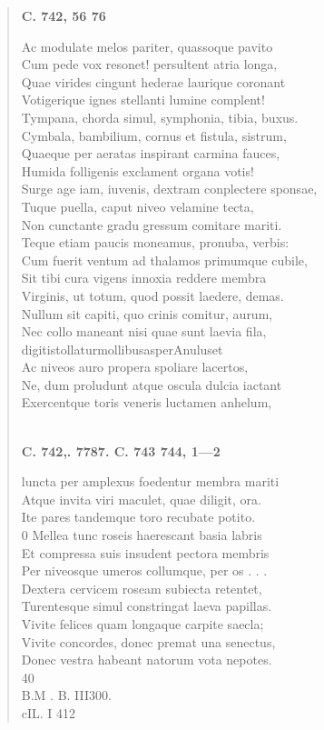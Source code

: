 \documentclass[11pt, a4paper]{report}
\begin{document}
\begin{verse}
     \marginpar{[228]} \begin{center} \textbf{C. 742, 56 76} \end{center}Ac modulate melos pariter, quassoque pavito \\ Cum pede vox resonet! persultent atria longa, \\ Quae virides cingunt hederae laurique coronant \\ Votigerique ignes stellanti lumine complent! \\ Tympana, chorda simul, symphonia, tibia, buxus. \\ Cymbala, bambilium, cornus et fistula, sistrum, \\ Quaeque per aeratas inspirant carmina fauces, \\ Humida folligenis exclament organa votis! \\ Surge age iam, iuvenis, dextram conplectere sponsae, \\ Tuque puella, caput niveo velamine tecta, \\ Non cunctante gradu gressum comitare mariti. \\ Teque etiam paucis moneamus, pronuba, verbis: \\ Cum fuerit ventum ad thalamos primumque cubile, \\ Sit tibi cura vigens innoxia reddere membra \\ Virginis, ut totum, quod possit laedere, demas. \\ Nullum sit capiti, quo crinis comitur, aurum, \\ Nec collo maneant nisi quae sunt laevia fila, \\ digitistollaturmollibusasperAnuluset \\ Ac niveos auro propera spoliare lacertos, \\ Ne, dum proludunt atque oscula dulcia iactant \\ Exercentque toris veneris luctamen anhelum, \\ 
        ﻿\pagebreak 
    \begin{center} \textbf{C. 742,. 7787. C. 743 744, 1—2} \end{center} \marginpar{[229]} luncta per amplexus foedentur membra mariti \\ Atque invita viri maculet, quae diligit, ora. \\ Ite pares tandemque toro recubate potito. \\ 0 Mellea tunc roseis haerescant basia labris \\ Et compressa suis insudent pectora membris \\ Per \rbrack  niveosque umeros collumque, per os . . . \\ Dextera cervicem roseam subiecta retentet, \\ Turentesque simul constringat laeva papillas. \\ Vivite felices quam longaque carpite saecla; \\ Vivite concordes, donec premat una senectus, \\ Donec \rbrack  vestra habeant natorum vota nepotes. \\ 40 \\ B.M . B. III300. \\ cIL. I 412 \\ 

\end{verse}
\end{document}
